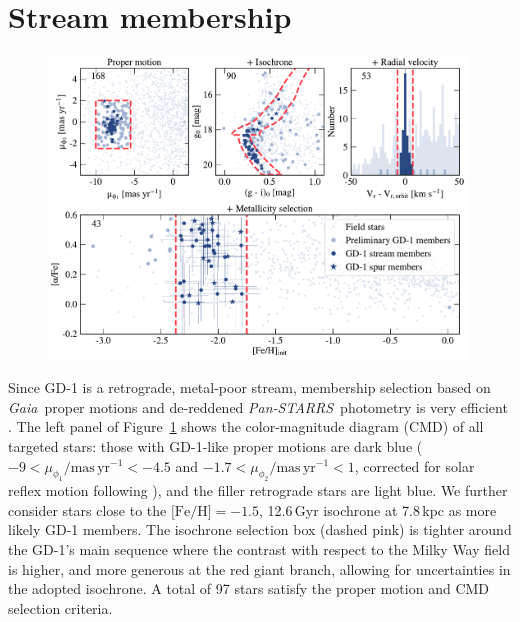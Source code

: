 \documentclass[twocolumn]{aastex63}
\newcommand{\gaia}{\textsl{Gaia}}
\newcommand{\pans}{\textsl{Pan-STARRS}}
\newcommand{\masyr}{\ensuremath{\textrm{mas}\,\textrm{yr}^{-1}}}
\begin{document}
\section{Stream membership}
\label{sec:membership}

\begin{figure}
\begin{center}
\includegraphics[width=0.99\textwidth]{members.pdf}
\end{center}
\caption{
}
\label{fig:members}
\end{figure}

Since GD-1 is a retrograde, metal-poor stream, membership selection based on \gaia\ proper motions \citep{gdr2} and de-reddened \pans\ photometry \citep{sfd, ps1} is very efficient \citep[e.g.,][]{pwb}.
The left panel of Figure~\ref{fig:members} shows the color-magnitude diagram (CMD) of all targeted stars: those with GD-1-like proper motions are dark blue ($-9<\mu_{\phi_1}/\masyr<-4.5$ and $-1.7<\mu_{\phi_2}/\masyr<1$, corrected for solar reflex motion following \citealt{pwb}), and the filler retrograde stars are light blue.
We further consider stars close to the $\textrm{[Fe/H]}=-1.5$, 12.6\,Gyr isochrone at 7.8\,kpc \citep{choi2016} as more likely GD-1 members.
The isochrone selection box (dashed pink) is tighter around the GD-1's main sequence where the contrast with respect to the Milky Way field is higher, and more generous at the red giant branch, allowing for uncertainties in the adopted isochrone.
A total of 97 stars satisfy the proper motion and CMD selection criteria.
\end{document}
